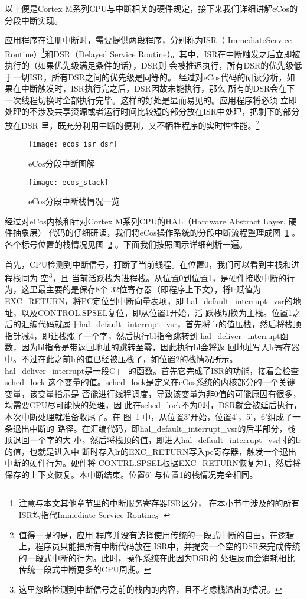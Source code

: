 以上便是Cortex M系列CPU与中断相关的硬件规定，接下来我们详细讲解eCos的分段中断实现。

应用程序在注册中断时，需要提供两段程序，分别称为ISR（
ImmediateService Routine）\footnote{注意与本文其他章节里的中断服务寄存器ISR区分，
在本小节中涉及的的所有ISR均指代Immediate Service Routine。}和DSR（Delayed Service 
Routine）。其中，ISR在中断触发之后立即被执行的（如果优先级满足条件的话），DSR则
会被推迟执行，所有DSR的优先级低于一切ISR，所有DSR之间的优先级是同等的。\cite{ecos_isr}
经过对eCos代码的研读分析，如果在中断触发时，ISR执行完之后，DSR因故未能执行，那么
所有的DSR会在下一次线程切换时全部执行完毕。这样的好处是显而易见的。应用程序将必须
立即处理的不涉及共享资源或者运行时间比较短的部分放在ISR中处理，把剩下的部分放在DSR
里，既充分利用中断的便利，又不牺牲程序的实时性性能。\footnote{值得一提的是，应用
程序并没有选择使用传统的一段式中断的自由。在逻辑上，程序员只能把所有中断代码放在
ISR中，并提交一个空的DSR来完成传统的一段式中断的行为。此时，操作系统在此因为DSR的
处理反而会消耗相比传统一段式中断更多的CPU周期。}

\begin{figure}
	\centering
	\texttt{[image: ecos\_isr\_dsr]}
	\caption{eCos分段中断图解}
	\label{fig:ecos_isr_dsr}
\end{figure}

\begin{figure}
	\centering
	\texttt{[image: ecos\_stack]}
	\caption{eCos分段中断栈情况一览}
	\label{fig:ecos_stack}
\end{figure}

经过对eCos内核和针对Cortex M系列CPU的HAL（Hardware Abstract Layer, 硬件抽象层）
代码的仔细研读，我们将eCos操作系统的分段中断流程整理成图~\ref{fig:ecos_isr_dsr} 。
各个标号位置的栈情况见图~\ref{fig:ecos_stack} 。下面我们按照图示详细剖析一遍。

首先，CPU检测到中断信号，打断了当前线程。在位置0，我们可以看到主栈和进程栈同为
空\footnote{这里忽略检测到中断信号之前的栈内的内容，且不考虑栈溢出的情况。}，且
当前活跃栈为进程栈。从位置0到位置1，是硬件接收中断的行为，这里最主要的是保存8个
32位寄存器（即程序上下文），将lr赋值为EXC\_RETURN，将PC定位到中断向量表项，即
hal\_default\_interrupt\_vsr的地址，以及CONTROL.SPSEL复位，即从位置1开始，活
跃栈切换为主栈。位置1之后的汇编代码就属于hal\_default\_interrupt\_vsr，首先将
lr的值压栈，然后将栈顶指针减4，即让栈涨了一个字，然后执行bl指令跳转到
hal\_deliver\_interrupt函数，因为bl指令是带返回地址的跳转至零，因此执行bl会将返
回地址写入lr寄存器中。不过在此之前lr的值已经被压栈了，如位置2的栈情况所示。
hal\_deliver\_interrupt是一段C++的函数。首先它完成了ISR的功能，接着会检查sched\_lock
这个变量的值。sched\_lock是定义在eCos系统的内核部分的一个关键变量，该变量指示是
否能进行线程调度，导致该变量为非0值的可能原因有很多，均需要CPU尽可能快的处理，因
此在sched\_lock不为0时，DSR就会被延后执行，本次中断处理就准备收尾了。在
图~\ref{fig:ecos_isr_dsr} 中，从位置3'开始，位置4'，5'，6'组成了一条退出中断的
路径。在汇编代码，即hal\_default\_interrupt\_vsr的后半部分，栈顶退回一个字的大
小，然后将栈顶的值，即进入hal\_default\_interrupt\_vsr时的lr的值，也就是进入中
断时存入lr的EXC\_RETURN写入pc寄存器，触发一个退出中断的硬件行为。硬件将
CONTRL.SPSEL根据EXC\_RETURN恢复为1，然后将保存的上下文恢复。本中断结束。位置6'
与位置1的栈情况完全相同。

